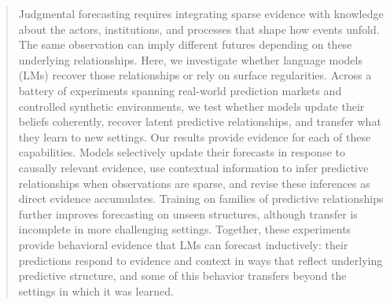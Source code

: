 \begin{abstract}
Judgmental forecasting requires integrating sparse evidence with knowledge about
the actors, institutions, and processes that shape how events unfold. The same
observation can imply different futures depending on these underlying
relationships. Here, we investigate whether language models (LMs) recover those
relationships or rely on surface regularities. Across a battery of experiments
spanning real-world prediction markets and controlled synthetic environments, we
test whether models update their beliefs coherently, recover latent predictive
relationships, and transfer what they learn to new settings. Our results provide
evidence for each of these capabilities. Models selectively update their
forecasts in response to causally relevant evidence, use contextual information
to infer predictive relationships when observations are sparse, and revise these
inferences as direct evidence accumulates. Training on families of predictive
relationships further improves forecasting on unseen structures, although
transfer is incomplete in more challenging settings. Together, these experiments
provide behavioral evidence that LMs can forecast inductively: their predictions
respond to evidence and context in ways that reflect underlying predictive
structure, and some of this behavior transfers beyond the settings in which it
was learned.\footnotemark
\end{abstract}
\vspace{-0.55em}
\enlargethispage{2\baselineskip}
